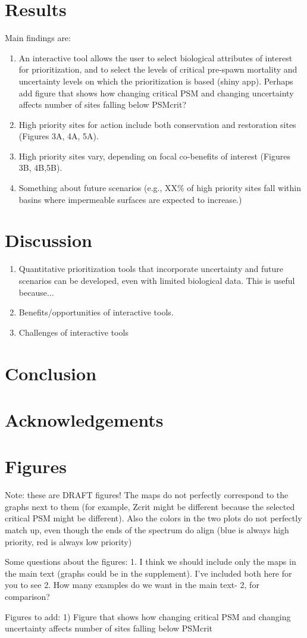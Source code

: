 \documentclass{article}
\begin{document}
\section*{Results}
Main findings are:
\begin{enumerate}
\item An interactive tool allows the user to select biological attributes of interest for prioritization, and to select the levels of critical pre-spawn mortality and uncertainty levels on which the prioritization is based (shiny app). Perhaps add figure that shows how changing critical PSM and changing uncertainty affects number of sites falling below PSMcrit?
\item High priority sites for action include both conservation and restoration sites (Figures 3A, 4A, 5A).
\item High priority sites vary, depending on focal co-benefits of interest (Figures 3B, 4B,5B).
\item Something about future scenarios (e.g., XX\% of high priority sites fall within basins where impermeable surfaces are expected to increase.)
\end{enumerate}
\section*{Discussion}
\begin{enumerate}
\item Quantitative prioritization tools that incorporate uncertainty and future scenarios can be developed, even with limited biological data. This is useful because...
\item Benefits/opportunities of interactive tools. 
\item Challenges of interactive tools

\end{enumerate}
\section*{Conclusion}

\section*{Acknowledgements}
\section* {Figures}
\par Note: these are DRAFT figures! The maps do not perfectly correspond to the graphs next to them (for example, Zcrit might be different because the selected critical PSM might be different). Also the colors in the two plots do not perfectly match up, even though the ends of the spectrum do align (blue is always high priority, red is always low priority) 
\par Some questions about the figures:
1. I think we should include only the maps in the main text (graphs could be in the supplement). I've included both here for you to see
2. How many examples do we want in the main text- 2, for comparison?
\par Figures to add:
1) Figure that shows how changing critical PSM and changing uncertainty affects number of sites falling below PSMcrit
\end{document}
